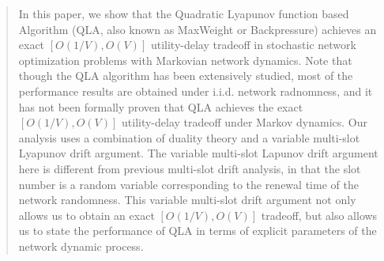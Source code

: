 \documentclass[journal]{IEEEtran}
\begin{document}
 
 \begin{abstract}
In this paper, we show that the Quadratic Lyapunov function based Algorithm (QLA, also  known as MaxWeight or Backpressure) achieves an exact $[O(1/V), O(V)]$ utility-delay tradeoff in stochastic network optimization problems with Markovian network dynamics. Note that though the QLA algorithm has been extensively studied, most of the performance results are obtained under i.i.d. network radnomness, and it has not been formally proven that QLA achieves the exact $[O(1/V), O(V)]$ utility-delay tradeoff under Markov dynamics. 
Our analysis uses a combination of duality theory and a variable multi-slot Lyapunov drift argument. The variable multi-slot Lapunov  drift argument here is different from previous multi-slot drift analysis, in that the slot number is a random variable corresponding to the renewal time of the network randomness. This variable multi-slot drift argument not only allows us to obtain an exact $[O(1/V), O(V)]$ tradeoff, but also allows us to state the performance of QLA in terms of explicit parameters of the network dynamic process. 






\end{abstract}
\end{document}
